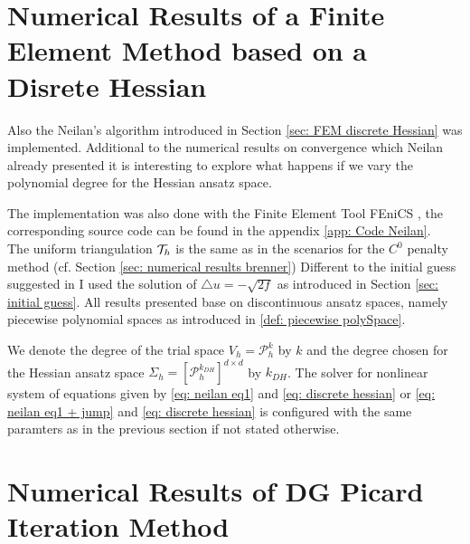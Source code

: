 \section{Numerical Results of a Finite Element Method based on a Disrete Hessian}\label{sec: numerical results neilan}

Also the Neilan's algorithm \cite{Neilan2014} introduced in Section \ref{sec: FEM discrete Hessian} was implemented.
Additional to the numerical results on convergence which Neilan already presented it is interesting to explore what happens if we vary the polynomial degree for the Hessian ansatz space. 

The implementation was also done with the Finite Element Tool FEniCS \cite{FEniCS}, the corresponding source code can be found in the appendix \ref{app: Code Neilan}. \\
The uniform triangulation $\mathcal{T}_h$ is the same as in the scenarios for the $C^0$ penalty method (cf. Section \ref{sec: numerical results brenner})
Different to the initial guess suggested in \cite{Neilan2014} I used the solution of $\triangle u = -\sqrt{2f}$ as introduced in Section \ref{sec: initial guess}. All results presented base on discontinuous ansatz spaces, namely piecewise polynomial spaces as introduced in \ref{def: piecewise polySpace}.

We denote the degree of the trial space $V_h=\mathcal P_h^k$ by $k$ and the degree chosen for the Hessian ansatz space $\Sigma_h = [\mathcal{P}_h^{k_{DH}}]^{d \times d}$ by $k_{DH}$. The solver for nonlinear system of equations given by \eqref{eq: neilan eq1} and \eqref{eq: discrete hessian} or \eqref{eq: neilan eq1 + jump} and \eqref{eq: discrete hessian} is configured with the same paramters as in the previous section if not stated otherwise. 










\newpage

\section{Numerical Results of DG Picard Iteration Method} \label{sec: numerical results our Method}

